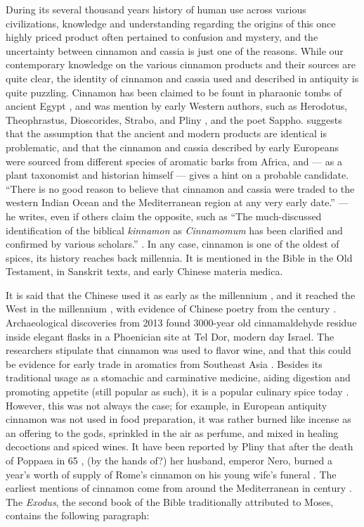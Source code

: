 During its several thousand years history of human use across various civilizations, knowledge and understanding regarding the origins of this once highly priced product often pertained to confusion and mystery, and the uncertainty between cinnamon and cassia is just one of the reasons. While our contemporary knowledge on the various cinnamon products and their sources are quite clear, the identity of cinnamon and cassia used and described in antiquity is quite puzzling. Cinnamon has been claimed to be fount in pharaonic tombs of ancient Egypt \parencite[see Meyerhof and Sobhy in][471,475]{al-ghafiki_abridged_1932}, and was mention by early Western authors, such as Herodotus, Theophrastus, Dioscorides, Strabo, and Pliny \parencite[541]{laufer_sino-iranica_1919}, and the poet Sappho. \textcite{haw_cinnamon_2017} suggests that the assumption that the ancient and modern products are identical is problematic, and that the cinnamon and cassia described by early Europeans were sourced from different species of aromatic barks from Africa, and --- as a plant taxonomist and historian himself --- gives a hint on a probable candidate. ``There is no good reason to believe that cinnamon and cassia were traded to the western Indian Ocean and the Mediterranean region at any very early date.'' --- he writes, even if others claim the opposite, such as ``The much-discussed identification of the biblical \textit{kinnamon} as \textit{Cinnamomum} has been clarified and confirmed by various scholars.'' \parencite[202]{zohary_plants_1982}. In any case, cinnamon is one of the oldest of spices, its history reaches back millennia. It is mentioned in the Bible in the Old Testament, in Sanskrit texts, and early Chinese \gls{materia medica}.

It is said that the Chinese used it as early as the  millennium \BC{}, and it reached the West in the  millennium \BC{} \parencites{dietrich_dar_2004}, with evidence of Chinese poetry from the  century \BC{} \autocite[38]{dalby_dangerous_2000}. Archaeological discoveries from 2013 found 3000-year old cinnamaldehyde residue inside elegant flasks in a Phoenician site at Tel Dor, modern day Israel. The researchers stipulate that cinnamon was used to flavor wine, and that this could be evidence for early trade in aromatics from Southeast Asia \parencite{namdar_cinnamaldehyde_2013}. Besides its traditional usage as a stomachic and carminative medicine, aiding digestion and promoting appetite (still popular as such), it is a popular culinary spice today \parencite{ulbricht_evidence-based_2011}. However, this was not always the case; for example, in European antiquity cinnamon was not used in food preparation, it was rather burned like incense as an offering to the gods, sprinkled in the air as perfume, and mixed in healing decoctions and spiced wines. It have been reported by Pliny that after the death of Poppaea in 65 \AD{}, (by the hands of?) her husband, emperor Nero, burned a year's worth of supply of Rome's cinnamon on his young wife's funeral \autocite{counts_regum_1996}. The earliest mentions of cinnamon come from around the Mediterranean in  century \BC{}. The \textit{Exodus}, the second book of the Bible traditionally attributed to Moses, contains the following paragraph: 

